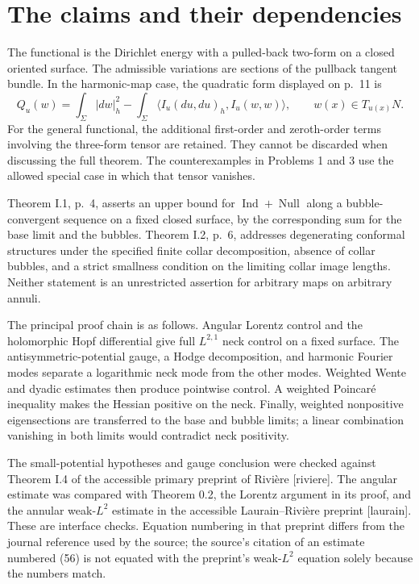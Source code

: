 \documentclass[10pt]{article}
\begin{document}
\section*{The claims and their dependencies}
The functional is the Dirichlet energy with a pulled-back two-form on a closed oriented surface. The admissible variations are sections of the pullback tangent bundle. In the harmonic-map case, the quadratic form displayed on p. 11 is \[Q_u(w)=\int_\Sigma |dw|_h^2
 -\int_\Sigma\langle I_u(du,du)_h,I_u(w,w)\rangle,
 \qquad w(x)\in T_{u(x)}N.\] For the general functional, the additional first-order and zeroth-order terms involving the three-form tensor are retained. They cannot be discarded when discussing the full theorem. The counterexamples in Problems 1 and 3 use the allowed special case in which that tensor vanishes.\par
Theorem I.1, p. 4, asserts an upper bound for \(\operatorname{Ind}+\operatorname{Null}\) along a bubble-convergent sequence on a fixed closed surface, by the corresponding sum for the base limit and the bubbles. Theorem I.2, p. 6, addresses degenerating conformal structures under the specified finite collar decomposition, absence of collar bubbles, and a strict smallness condition on the limiting collar image lengths. Neither statement is an unrestricted assertion for arbitrary maps on arbitrary annuli.\par
The principal proof chain is as follows. Angular Lorentz control and the holomorphic Hopf differential give full \(L^{2,1}\) neck control on a fixed surface. The antisymmetric-potential gauge, a Hodge decomposition, and harmonic Fourier modes separate a logarithmic neck mode from the other modes. Weighted Wente and dyadic estimates then produce pointwise control. A weighted Poincaré inequality makes the Hessian positive on the neck. Finally, weighted nonpositive eigensections are transferred to the base and bubble limits; a linear combination vanishing in both limits would contradict neck positivity.\par
The small-potential hypotheses and gauge conclusion were checked against Theorem I.4 of the accessible primary preprint of Rivière [riviere]. The angular estimate was compared with Theorem 0.2, the Lorentz argument in its proof, and the annular weak-\(L^2\) estimate in the accessible Laurain–Rivière preprint [laurain]. These are interface checks. Equation numbering in that preprint differs from the journal reference used by the source; the source’s citation of an estimate numbered (56) is not equated with the preprint’s weak-\(L^2\) equation solely because the numbers match.\par
\end{document}
